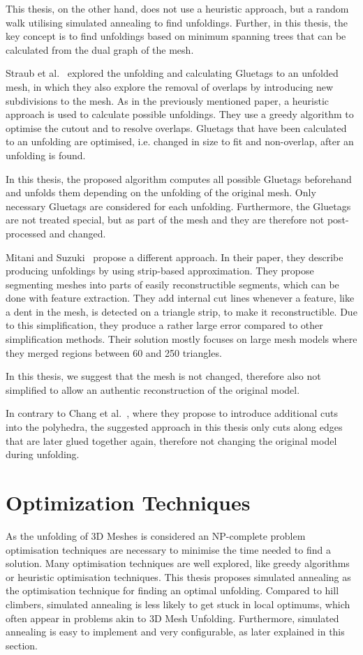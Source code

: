 \documentclass[draft,final]{vutinfth} %
\begin{document}
This thesis, on the other hand, does not use a heuristic approach, but a random walk utilising simulated annealing to find unfoldings. Further, in this thesis, the key concept is to find unfoldings based on minimum spanning trees that can be calculated from the dual graph of the mesh.

Straub et al.~\cite{straubcreating} explored the unfolding and calculating Gluetags to an unfolded mesh, in which they also explore the removal of overlaps by introducing new subdivisions to the mesh. As in the previously mentioned paper, a heuristic approach is used to calculate possible unfoldings. They use a greedy algorithm to optimise the cutout and to resolve overlaps. Gluetags that have been calculated to an unfolding are optimised, i.e. changed in size to fit and non-overlap, after an unfolding is found.

In this thesis, the proposed algorithm computes all possible Gluetags beforehand and unfolds them depending on the unfolding of the original mesh. Only necessary Gluetags are considered for each unfolding. Furthermore, the Gluetags are not treated special, but as part of the mesh and they are therefore not post-processed and changed.

Mitani and Suzuki~\cite{mitani2004making} propose a different approach. In their paper, they describe producing unfoldings by using strip-based approximation. They propose segmenting meshes into parts of easily reconstructible segments, which can be done with feature extraction. They add internal cut lines whenever a feature, like a dent in the mesh, is detected on a triangle strip, to make it reconstructible. Due to this simplification, they produce a rather large error compared to other simplification methods. Their solution mostly focuses on large mesh models where they merged regions between 60 and 250 triangles.

In this thesis, we suggest that the mesh is not changed, therefore also not simplified to allow an authentic reconstruction of the original model. 

In contrary to Chang et al.~\cite{chang2017improved}, where they propose to introduce additional cuts into the polyhedra, the suggested approach in this thesis only cuts along edges that are later glued together again, therefore not changing the original model during unfolding.

\section{Optimization Techniques}
\label{sec:sa}
As the unfolding of 3D Meshes is considered an NP-complete problem\cite{haenselmann2012optimal} optimisation techniques are necessary to minimise the time needed to find a solution. Many optimisation techniques are well explored, like greedy algorithms\cite{devore1996some} or heuristic optimisation techniques\cite{lee2008modern}. This thesis proposes simulated annealing as the optimisation technique for finding an optimal unfolding. Compared to hill climbers, simulated annealing is less likely to get stuck in local optimums, which often appear in problems akin to 3D Mesh Unfolding. Furthermore, simulated annealing is easy to implement and very configurable, as later explained in this section.
\end{document}
